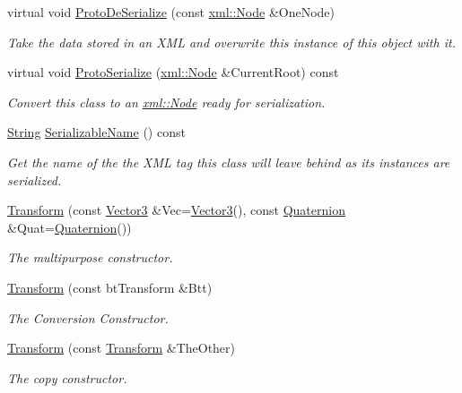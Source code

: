 \begin{DoxyCompactItemize}
virtual void \hyperlink{classphys_1_1Transform_a230f5731f07400998d5eed6c6b60f7a6}{ProtoDeSerialize} (const \hyperlink{classphys_1_1xml_1_1Node}{xml::Node} \&OneNode)
\begin{DoxyCompactList}\small\item\em Take the data stored in an XML and overwrite this instance of this object with it. \item\end{DoxyCompactList}\item 
virtual void \hyperlink{classphys_1_1Transform_a6a054d1eeb12a12451b8134acd8cb78a}{ProtoSerialize} (\hyperlink{classphys_1_1xml_1_1Node}{xml::Node} \&CurrentRoot) const 
\begin{DoxyCompactList}\small\item\em Convert this class to an \hyperlink{classphys_1_1xml_1_1Node}{xml::Node} ready for serialization. \item\end{DoxyCompactList}\item 
\hyperlink{namespacephys_aa03900411993de7fbfec4789bc1d392e}{String} \hyperlink{classphys_1_1Transform_ab2748257efa01648ff56b5d8e9eb0007}{SerializableName} () const 
\begin{DoxyCompactList}\small\item\em Get the name of the the XML tag this class will leave behind as its instances are serialized. \item\end{DoxyCompactList}\item 
\hyperlink{classphys_1_1Transform_aaf6c6fc02fbd2a1aaad0000757bc20f6}{Transform} (const \hyperlink{classphys_1_1Vector3}{Vector3} \&Vec=\hyperlink{classphys_1_1Vector3}{Vector3}(), const \hyperlink{classphys_1_1Quaternion}{Quaternion} \&Quat=\hyperlink{classphys_1_1Quaternion}{Quaternion}())
\begin{DoxyCompactList}\small\item\em The multipurpose constructor. \item\end{DoxyCompactList}\item 
\hyperlink{classphys_1_1Transform_a5b6867700fd10297a10208d389055a05}{Transform} (const btTransform \&Btt)
\begin{DoxyCompactList}\small\item\em The Conversion Constructor. \item\end{DoxyCompactList}\item 
\hyperlink{classphys_1_1Transform_abd1b1ae62d8efd807a162a0a1ac35baa}{Transform} (const \hyperlink{classphys_1_1Transform}{Transform} \&TheOther)
\begin{DoxyCompactList}\small\item\em The copy constructor. \item\end{DoxyCompactList}\end{DoxyCompactItemize}
